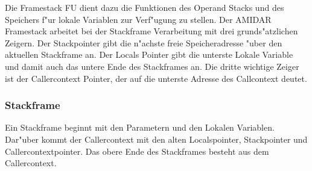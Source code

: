 Die Framestack FU dient dazu die Funktionen des Operand Stacks und des Speichers f"ur lokale Variablen zur Verf"ugung zu stellen. 
Der AMIDAR Framestack arbeitet bei der Stackframe Verarbeitung mit drei grunds"atzlichen Zeigern. Der Stackpointer gibt die n"achste freie Speicheradresse "uber den aktuellen Stackframe an. Der Locals Pointer gibt die unterste Lokale Variable und damit auch das untere Ende des Stackframes an. Die dritte wichtige Zeiger ist der Callercontext Pointer, der auf die unterste Adresse des Callcontext deutet. 

\subsubsection{Stackframe}
Ein Stackframe beginnt mit den Parametern und den Lokalen Variablen.  Dar"uber kommt der Callercontext mit den alten Localspointer, Stackpointer und Callercontextpointer. Das obere Ende des Stackframes besteht aus dem Callercontext. 

